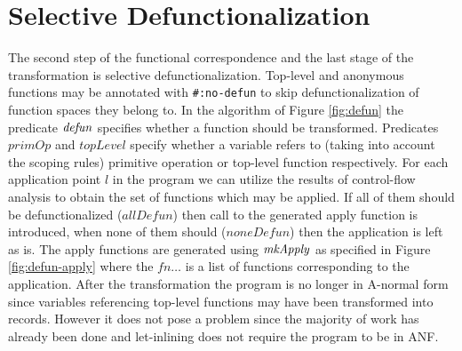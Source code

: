 \section{Selective Defunctionalization}\label{sec:selective-defun}
The second step of the functional correspondence and the last stage of the transformation is selective defunctionalization.
Top-level and anonymous functions may be annotated with \lstinline!#:no-defun! to skip defunctionalization of function spaces they belong to.
In the algorithm of Figure \ref{fig:defun} the predicate $\mathit{defun}$ specifies whether a function should be transformed.
Predicates $\mathit{primOp}$ and $\mathit{topLevel}$ specify whether a variable refers to (taking into account the scoping rules) primitive operation or top-level function respectively.
For each application point $l$ in the program we can utilize the results of control-flow analysis to obtain the set of functions which may be applied.
If all of them should be defunctionalized ($\mathit{allDefun}$) then call to the generated apply function is introduced, when none of them should ($\mathit{noneDefun}$) then the application is left as is.
The apply functions are generated using $\mathit{mkApply}$ as specified in Figure \ref{fig:defun-apply} where the $\mathit{fn}\ldots$ is a list of functions corresponding to the application.
After the transformation the program is no longer in A-normal form since variables referencing top-level functions may have been transformed into records.
However it does not pose a problem since the majority of work has already been done and let-inlining does not require the program to be in ANF.




